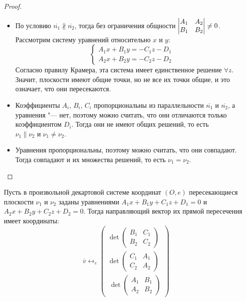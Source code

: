 \begin{proof}~
	\begin{itemize}
		\item По условию $\overline{n_1} \nparallel \overline{n_2}$, тогда без ограничения общности $\begin{vmatrix}A_1 & A_2\\B_1 & B_2\end{vmatrix} \hm{\ne} 0$. Рассмотрим систему уравнений относительно $x$ и $y$:
		\[\left\{
		\begin{aligned}
		A_1x + B_1y = -C_1z -D_1\\
		A_2x + B_2y = -C_2z -D_2
		\end{aligned}
		\right.
		\]
		Согласно правилу Крамера, эта система имеет единственное решение $\forall z$. Значит, плоскости имеют общие точки, но не все их точки общие, и это означает, что они пересекаются.
		\item Коэффициенты $A_i$, $B_i$, $C_i$ пропорциональны из параллельности $\overline{n_1}$ и $\overline{n_2}$, а уравнения "--- нет, поэтому можно считать, что они отличаются только коэффициентом $D_i$. Тогда они не имеют общих решений, то есть $\nu_1 \parallel \nu_2 \text{ и } \nu_1 \ne \nu_2$.
		\item Уравнения пропорциональны, поэтому можно считать, что они совпадают. Тогда совпадают и их множества решений, то есть $\nu_1 = \nu_2$.
	\end{itemize}
\end{proof}

\begin{proposition}
	Пусть в произвольной декартовой системе координат $(O, e)$ пересекающиеся плоскости $\nu_1$ и $\nu_2$ заданы уравнениями $A_1x+B_1y+C_1z+D_1 = 0$ и $A_2x+B_2y+C_2z+D_2 = 0$. Тогда направляющий вектор их прямой пересечения имеет координаты:
	\[\overline{v} \leftrightarrow_{e}
	\begin{pmatrix}
	\det\begin{pmatrix}
	B_1&C_1\\
	B_2&C_2
	\end{pmatrix}\\
	\det\begin{pmatrix}
	C_1&A_1\\
	C_2&A_2
	\end{pmatrix}\\~
	\det\begin{pmatrix}
	A_1&B_1\\
	A_2&B_2
	\end{pmatrix}
	\end{pmatrix}\]
\end{proposition}

